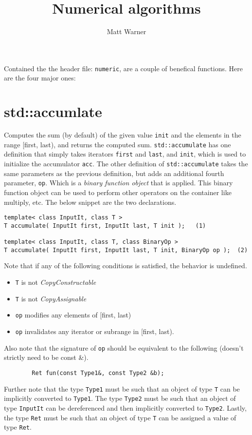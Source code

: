 \documentclass{report}
\title{\Huge{Numerical algorithms}}
\author{\huge{Matt Warner}}
\date{\huge{}}
\begin{document}
    \maketitle
\noindent Contained the the header file: \texttt{numeric}, are a couple of benefical functions. Here are the four major ones:
\section{std::accumlate}
Computes the sum (by default) of the given value \texttt{init} and the elements in the range [first, last), and returns the computed sum. \texttt{std::accumulate} has one definition that simply takes iterators \texttt{first} and \texttt{last}, and \texttt{init}, which is used to initialize the accumulator \texttt{acc}. The other definition of \texttt{std::accumulate} takes the same parameters as the previous definition, but adds an additional fourth parameter, \texttt{op}. Which is a \textit{binary function object} that is applied. This binary function object can be used to perform other operators on the container like multiply, etc.
\bigbreak \noindent
The below snippet are the two declarations.
\begin{verbatim}
template< class InputIt, class T >
T accumulate( InputIt first, InputIt last, T init );   (1)

template< class InputIt, class T, class BinaryOp >
T accumulate( InputIt first, InputIt last, T init, BinaryOp op );  (2)
\end{verbatim}
Note that if any of the following conditions is satisfied, the behavior is undefined.
\begin{itemize}
    \item \texttt{T} is not \textit{CopyConstructable}
    \item \texttt{T} is not \textit{CopyAssignable}
    \item \texttt{op} modifies any elements of [first, last)
    \item \texttt{op} invalidates any iterator or subrange in [first, last).
\end{itemize}
        \bigbreak \noindent
        Also note that the signature of \texttt{op} should be equivalent to the following (doesn't strictly need to be const \&).
        \begin{verbatim}
        Ret fun(const Type1&, const Type2 &b);
        \end{verbatim}
        \noindent Further note that the type \texttt{Type1} must be such that an object of type \texttt{T} can be implicitly converted to \texttt{Type1}. The type \texttt{Type2} must be such that an object of type \texttt{InputIt} can be dereferenced and then implicitly converted to \texttt{Type2}. Lastly, the type \texttt{Ret} must be such that an object of type \texttt{T} can be assigned a value of type \texttt{Ret}.
\end{document}

